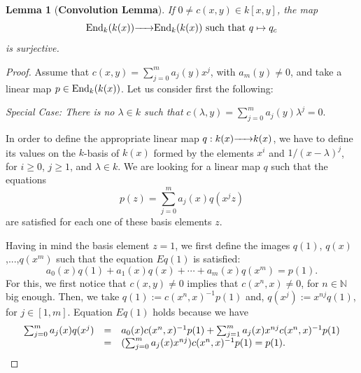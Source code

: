 \documentclass{article}
\newtheorem{lemma}[theorem]{Lemma}
\theoremstyle{definition}
\newcommand{\End}{{ \rm End }}
\newcommand{\hueca}[1]{\mathbb{#1}}
\newcommand{\rightmap}[1]{\smash{\mathop{\hbox to 
20pt{\rightarrowfill}}\limits^{#1}}}
\begin{document}
\begin{lemma}[{\bf Convolution Lemma}]\label{L: convolution map sobre} If $0\not=c(x,y)\in k[x,y]$,  the map 
$$\End_k(k(x))\rightmap{}\End_k(k(x))\hbox{ such that }q\mapsto q_c$$ is surjective. 
\end{lemma}

\begin{proof} Assume that $c(x,y)=\sum_{j=0}^ma_j(y)x^j$, with $a_m(y)\not=0$, and take a linear map $p\in \End_k(k(x))$. Let us consider first the following:
\medskip

\noindent\emph{Special Case: There is no $\lambda\in k$ such that 
$c(\lambda,y)=\sum_{j=0}^ma_j(y)\lambda^j=0.$}
\medskip


In order to define the appropriate linear map $q:k(x)\rightmap{}k(x)$, we have to define its values on the $k$-basis of $k(x)$ formed by the elements $x^i$ and $1/(x-\lambda)^j$, for $i\geq 0$, $j\geq 1$, and $\lambda\in k$. We are looking for a linear map $q$ such that the equations 
\begin{equation}\tag{$Eq(z)$}
 p(z)=\sum_{j=0}^ma_j(x)q(x^jz)
\end{equation}
 are satisfied for each one of these basis elements $z$. 



Having in mind the basis element $z=1$, we first define the images $q(1)$, $q(x)$,...,$q(x^m)$ such that the equation $Eq(1)$ is satisfied:   
$$a_0(x)q(1)+a_1(x)q(x)+\cdots+a_m(x)q(x^m)=p(1).$$
For this, we first notice that $c(x,y)\not=0$ implies that $c(x^n,x)\not=0$, for $n\in \hueca{N}$ big enough. Then, we take $q(1):=c(x^n,x)^{-1}p(1)$ and, $q(x^j):=x^{nj}q(1)$, for $j\in [1,m]$. Equation $Eq(1)$ holds because  we have 
$$\begin{matrix}
\sum_{j=0}^ma_j(x)q(x^j)&=&a_0(x)c(x^n,x)^{-1} p(1)+\sum_{j=1}^ma_j(x)x^{nj}c(x^n,x)^{-1}p(1)\hfill\\
&=&
(\sum_{j=0}^ma_j(x)x^{nj})c(x^n,x)^{-1}p(1)=p(1).\hfill\\
\end{matrix}$$


\end{proof}
\end{document}
